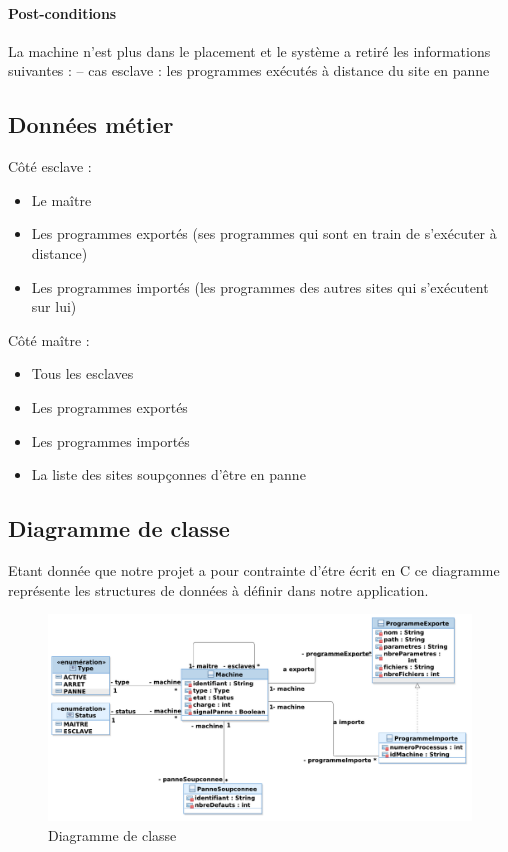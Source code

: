     \paragraph{Post-conditions}
            La machine n'est plus dans le placement et le système a retiré les informations suivantes :
                – cas esclave : les programmes exécutés à distance du site en panne


\subsection{Données métier}
  
  \noindent Côté esclave :
    \begin{itemize}
      \item Le maître
      \item Les programmes exportés (ses programmes qui sont en train de s'exécuter à distance)
      \item Les programmes importés (les programmes des autres sites qui s'exécutent sur lui)
     \end{itemize}
        
   \noindent Côté maître :
     \begin{itemize}
       \item Tous les esclaves
       \item Les programmes exportés
       \item Les programmes importés
       \item La liste des sites soupçonnes d'être en panne
      \end{itemize} 
        
\subsection{Diagramme de classe}
  Etant donnée que notre projet a pour contrainte d'étre écrit en C ce 
  diagramme représente les structures de données à définir dans notre
  application.

     \begin{figure}[h!]
       \centering
       \includegraphics[width=\textwidth]{img/analyse_dcl.pdf}
       \caption{Diagramme de classe}
     \end{figure}
\newpage

